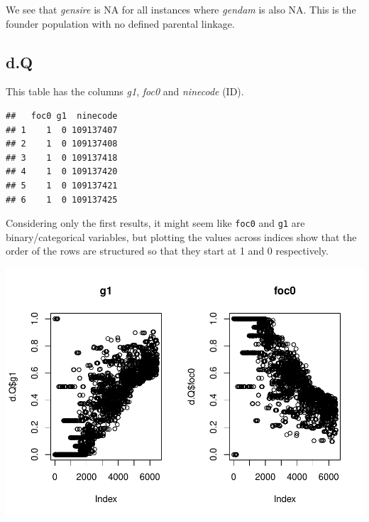 We see that \emph{gensire} is NA for all instances where \emph{gendam}
is also NA. This is the founder population with no defined parental
linkage.

\hypertarget{d.q}{%
\subsection*{d.Q}\label{d.q}}

This table has the columns \emph{g1}, \emph{foc0} and \emph{ninecode}
(ID).

\begin{Shaded}
\begin{Highlighting}[]
\end{Highlighting}
\end{Shaded}

\begin{verbatim}
##   foc0 g1  ninecode
## 1    1  0 109137407
## 2    1  0 109137408
## 3    1  0 109137418
## 4    1  0 109137420
## 5    1  0 109137421
## 6    1  0 109137425
\end{verbatim}

Considering only the first results, it might seem like \texttt{foc0} and
\texttt{g1} are binary/categorical variables, but plotting the values
across indices show that the order of the rows are structured so that
they start at 1 and 0 respectively.

\begin{Shaded}
\begin{Highlighting}[]
\NormalTok{(} \NormalTok{(}\NormalTok{, }\NormalTok{))}
\SpecialCharTok{$} \NormalTok{)}
\SpecialCharTok{$} \NormalTok{)}
\end{Highlighting}
\end{Shaded}

\includegraphics{EDA_files/figure-latex/unnamed-chunk-2-1.pdf}

